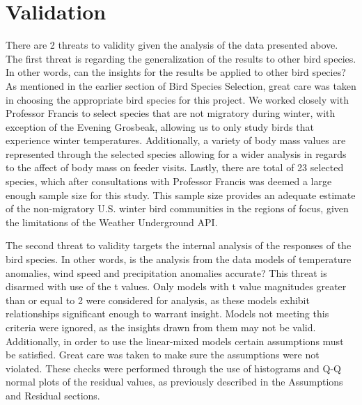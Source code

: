 \section{Validation}

There are 2 threats to validity given the analysis of the data presented above. The first threat is regarding the generalization of the results to other bird species. In other words, can the insights for the results be applied to other bird species? As mentioned in the earlier section of Bird Species Selection, great care was taken in choosing the appropriate bird species for this project. We worked closely with Professor Francis to select species that are not migratory during winter, with exception of the Evening Grosbeak, allowing us to only study birds that experience winter temperatures. Additionally, a variety of body mass values are represented through the selected species allowing for a wider analysis in regards to the affect of body mass on feeder visits. Lastly, there are total of 23 selected species, which after consultations with Professor Francis was deemed a large enough sample size for this study. This sample size provides an adequate estimate of the non-migratory U.S. winter bird communities in the regions of focus, given the limitations of the Weather Underground API. 

The second threat to validity targets the internal analysis of the responses of the bird species. In other words, is the analysis from the data models of temperature anomalies, wind speed and precipitation anomalies accurate? This threat is disarmed with use of the t values. Only models with t value magnitudes greater than or equal to 2 were considered for analysis, as these models exhibit relationships significant enough to warrant insight. Models not meeting this criteria were ignored, as the insights drawn from them may not be valid. Additionally, in order to use the linear-mixed models certain assumptions must be satisfied. Great care was taken to make sure the assumptions were not violated. These checks were performed through the use of histograms and Q-Q normal plots of the residual values, as previously described in the Assumptions and Residual sections.    





